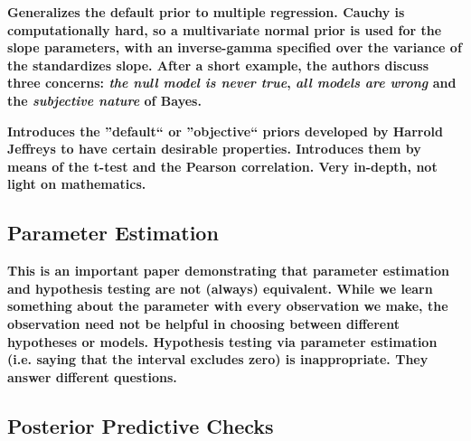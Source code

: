 \documentclass[12pt]{scrartcl}
\begin{document}
\begin{description}
  \textbf{Generalizes the default prior to multiple regression. Cauchy is computationally hard, so a multivariate normal prior is used for the slope parameters, with an inverse-gamma specified over the variance of the standardizes slope. After a short example, the authors discuss three concerns: \emph{the null model is never true}, \emph{all models are wrong} and the \emph{subjective nature} of Bayes.}
  
  \item {}
  
  \item {}
  
  \item {}
  
  \textbf{Introduces the ''default`` or ''objective`` priors developed by Harrold Jeffreys to have certain desirable properties. Introduces them by means of the t-test and the Pearson correlation. Very in-depth, not light on mathematics.}
\end{description}


\subsection{Parameter Estimation}
\begin{description}
  \item {}
  
  \item {}
  
  \textbf{This is an important paper demonstrating that parameter estimation and hypothesis testing are not (always) equivalent. While we learn something about the parameter with every observation we make, the observation need not be helpful in choosing between different hypotheses or models. Hypothesis testing via parameter estimation (i.e. saying that the interval excludes zero) is inappropriate. They answer different questions.}
\end{description}

\subsection{Posterior Predictive Checks}
\begin{description}
    \item {}
    \item {}
    \item {}
\end{description}
\end{document}
